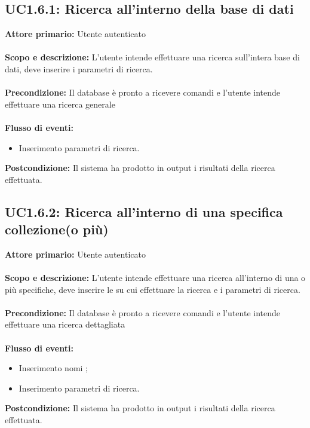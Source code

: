 \documentclass{scalatekids-article}
\begin{document}
\subsection{UC1.6.1: Ricerca all'interno della base di dati}
\textbf{Attore primario:} Utente autenticato \\ \\
\textbf{Scopo e descrizione:} L’utente intende effettuare una ricerca sull’intera base di dati, deve inserire i parametri di ricerca.\\ \\
\textbf{Precondizione:} Il database è pronto a ricevere comandi e l’utente intende effettuare una ricerca generale\\ \\
\textbf{Flusso di eventi:}
\begin{itemize}
\item Inserimento parametri di ricerca.
\end{itemize}
\textbf{Postcondizione:} Il sistema ha prodotto in output i risultati della ricerca effettuata.
\subsection{UC1.6.2: Ricerca all'interno di una specifica collezione(o più)}
\textbf{Attore primario:} Utente autenticato \\ \\
\textbf{Scopo e descrizione:} L’utente intende effettuare una ricerca all’interno di una o più  specifiche, deve inserire le  su cui effettuare la ricerca e i parametri di ricerca.\\ \\
\textbf{Precondizione:} Il database è pronto a ricevere comandi e l’utente intende effettuare una ricerca dettagliata\\ \\
\textbf{Flusso di eventi:}
\begin{itemize}
\item Inserimento nomi ;
\item Inserimento parametri di ricerca.
\end{itemize}
\textbf{Postcondizione:} Il sistema ha prodotto in output i risultati della ricerca effettuata.
\end{document}
